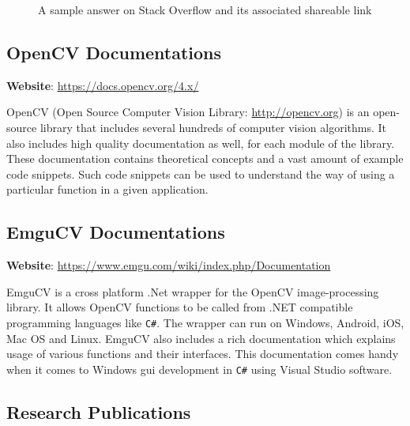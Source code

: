 \documentclass[a4paper,12pt]{report}%
\begin{document}
\begin{figure}[h]
	\centering
	\caption{A sample answer on Stack Overflow and its associated shareable link}
	\label{fig:stackof}
\end{figure}

\subsection{OpenCV Documentations}

\textbf{Website}: \url{https://docs.opencv.org/4.x/}

OpenCV (Open Source Computer Vision Library: \url{http://opencv.org}) is an open-source library that includes several hundreds of computer vision algorithms. It also includes high quality documentation as well, for each module of the library. These documentation contains theoretical concepts and a vast amount of example code snippets. Such code snippets can be used to understand the way of using a particular function in a given application. 

\subsection{EmguCV Documentations}
\label{EmguCV Documentations}

\textbf{Website}: \url{https://www.emgu.com/wiki/index.php/Documentation}

EmguCV is a  cross platform .Net wrapper for the OpenCV image-processing library. It allows OpenCV functions to be called from .NET compatible programming languages like {\tt C\#}. The wrapper can run on Windows, Android, iOS, Mac OS and Linux. EmguCV also includes a rich documentation which explains usage of various functions and their interfaces. This documentation comes handy when it comes to Windows \ac{gui} development in {\tt C\#} using Visual Studio software.

\subsection{Research Publications}
\end{document}
